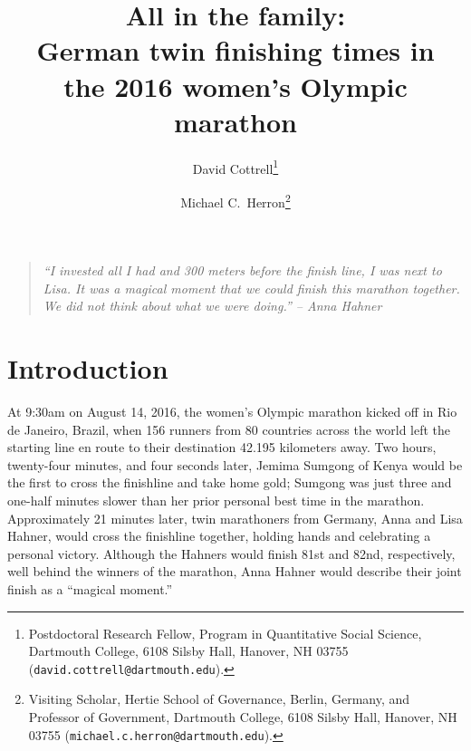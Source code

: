 \documentclass[12pt,titlepage]{article}
\begin{document}
\sloppy
\thispagestyle{empty}


\renewcommand{\topfraction}{.85}
\renewcommand{\bottomfraction}{.7}
\renewcommand{\textfraction}{.15}
\renewcommand{\floatpagefraction}{.66}
\renewcommand{\dbltopfraction}{.66}
\renewcommand{\dblfloatpagefraction}{.66}

\newcommand{\Yi}{\ensuremath{Y_i}}



\title{\Large{All in the family:\\German twin finishing times in\\the
    2016 women's Olympic marathon}}\author{David
  Cottrell\thanks{Postdoctoral Research Fellow, Program in
    Quantitative Social Science, Dartmouth College, 6108 Silsby Hall,
    Hanover, NH 03755 (\texttt{david.cottrell@dartmouth.edu}).} \and
  Michael C.\ Herron\thanks{Visiting Scholar, Hertie School of
    Governance, Berlin, Germany, and Professor of Government,
    Dartmouth College, 6108 Silsby Hall, Hanover, NH 03755
    (\texttt{michael.c.herron@dartmouth.edu}).}}


\maketitle \doublespacing 




\begin{quote}
  \emph{``I invested all I had and 300 meters before the finish line,
    I was next to Lisa. It was a magical moment that we could finish
    this marathon together. We did not think about what we were
    doing.'' -- Anna Hahner}
\end{quote}


\section*{Introduction}

At 9:30am on August 14, 2016, the women's Olympic marathon kicked off
in Rio de Janeiro, Brazil, when 156 runners from 80 countries across
the world left the starting line en route to their destination 42.195
kilometers away. Two hours, twenty-four minutes, and four seconds
later, Jemima Sumgong of Kenya would be the first to cross the
finishline and take home gold; Sumgong was just three and one-half
minutes slower than her prior personal best time in the
marathon. Approximately 21 minutes later, twin marathoners from
Germany, Anna and Lisa Hahner, would cross the finishline together,
holding hands and celebrating a personal victory. Although the Hahners
would finish 81st and 82nd, respectively, well behind the winners of
the marathon, Anna Hahner would describe their joint finish as a
``magical moment.''
\end{document}
